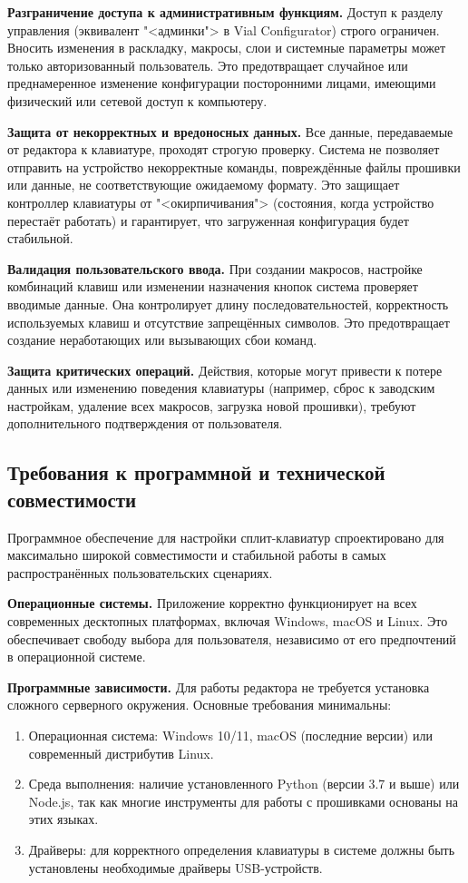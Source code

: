 \textbf{Разграничение доступа к административным функциям.} Доступ к разделу управления (эквивалент "<админки"> в Vial Configurator) строго ограничен. Вносить изменения в раскладку, макросы, слои и системные параметры может только авторизованный пользователь. Это предотвращает случайное или преднамеренное изменение конфигурации посторонними лицами, имеющими физический или сетевой доступ к компьютеру.

\textbf{Защита от некорректных и вредоносных данных.} Все данные, передаваемые от редактора к клавиатуре, проходят строгую проверку. Система не позволяет отправить на устройство некорректные команды, повреждённые файлы прошивки или данные, не соответствующие ожидаемому формату. Это защищает контроллер клавиатуры от "<окирпичивания"> (состояния, когда устройство перестаёт работать) и гарантирует, что загруженная конфигурация будет стабильной.

\textbf{Валидация пользовательского ввода.} При создании макросов, настройке комбинаций клавиш или изменении назначения кнопок система проверяет вводимые данные. Она контролирует длину последовательностей, корректность используемых клавиш и отсутствие запрещённых символов. Это предотвращает создание неработающих или вызывающих сбои команд.

\textbf{Защита критических операций.} Действия, которые могут привести к потере данных или изменению поведения клавиатуры (например, сброс к заводским настройкам, удаление всех макросов, загрузка новой прошивки), требуют дополнительного подтверждения от пользователя.

\subsection{Требования к программной и технической совместимости}

Программное обеспечение для настройки сплит-клавиатур спроектировано для максимально широкой совместимости и стабильной работы в самых распространённых пользовательских сценариях.

\textbf{Операционные системы.} Приложение корректно функционирует на всех современных десктопных платформах, включая Windows, macOS и Linux. Это обеспечивает свободу выбора для пользователя, независимо от его предпочтений в операционной системе.

\textbf{Программные зависимости.} Для работы редактора не требуется установка сложного серверного окружения. Основные требования минимальны:

\begin{enumerate}
\item Операционная система: Windows 10/11, macOS (последние версии) или современный дистрибутив Linux.
\item Среда выполнения: наличие установленного Python (версии 3.7 и выше) или Node.js, так как многие инструменты для работы с прошивками основаны на этих языках.
\item Драйверы: для корректного определения клавиатуры в системе должны быть установлены необходимые драйверы USB-устройств.
\end{enumerate}

